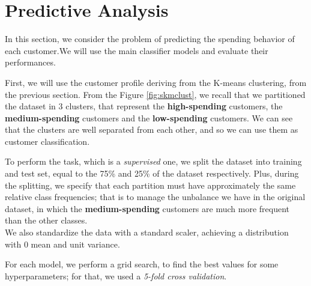 \section{Predictive Analysis}
In this section, we consider the problem of predicting the spending behavior of each customer.We will use the main classifier models and evaluate their performances.

First, we will use the customer profile deriving from the K-means clustering, from the previous section.
From the Figure \ref{fig:skmclust}, we recall that we partitioned the dataset in 3 clusters, that represent the \textbf{high-spending} customers, the \textbf{medium-spending} customers and the \textbf{low-spending} customers.
We can see that the clusters are well separated from each other, and so we can use them as customer classification. 

To perform the task, which is a \emph{supervised} one, we split the dataset into training and test set, equal to the 75\% and 25\% of the dataset respectively. Plus, during the splitting, we specify that each partition must have approximately the same relative class frequencies;
that is to manage the unbalance we have in the original dataset, in which the \textbf{medium-spending} customers are much more frequent than the other classes.\\
We also standardize the data with a standard scaler, achieving a distribution with 0 mean and unit variance.

For each model, we perform a grid search, to find the best values for some hyperparameters; for that, we used a \emph{5-fold cross validation}.

